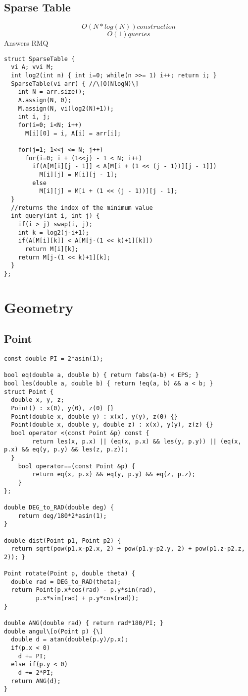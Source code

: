 \documentclass[11pt, oneside]{article}
\begin{document}
\subsection{Sparse Table}
\[O(N*log(N)) construction\]
\[O(1) queries\]
Answers RMQ
\begin{lstlisting}
struct SparseTable {
  vi A; vvi M;
  int log2(int n) { int i=0; while(n >>= 1) i++; return i; }
  SparseTable(vi arr) { //\[O(NlogN)\]
    int N = arr.size();
    A.assign(N, 0);
    M.assign(N, vi(log2(N)+1));
    int i, j;
    for(i=0; i<N; i++)
      M[i][0] = i, A[i] = arr[i];

    for(j=1; 1<<j <= N; j++)
      for(i=0; i + (1<<j) - 1 < N; i++)
        if(A[M[i][j - 1]] < A[M[i + (1 << (j - 1))][j - 1]])
          M[i][j] = M[i][j - 1];
        else
          M[i][j] = M[i + (1 << (j - 1))][j - 1];
  }
  //returns the index of the minimum value
  int query(int i, int j) {
    if(i > j) swap(i, j);
    int k = log2(j-i+1);
    if(A[M[i][k]] < A[M[j-(1 << k)+1][k]])
      return M[i][k];
    return M[j-(1 << k)+1][k];
  }
};
\end{lstlisting}

\section{Geometry}

\subsection{Point}
\begin{lstlisting}
const double PI = 2*asin(1);

bool eq(double a, double b) { return fabs(a-b) < EPS; }
bool les(double a, double b) { return !eq(a, b) && a < b; }
struct Point {
  double x, y, z;
  Point() : x(0), y(0), z(0) {}
  Point(double x, double y) : x(x), y(y), z(0) {}
  Point(double x, double y, double z) : x(x), y(y), z(z) {}
  bool operator <(const Point &p) const {
        return les(x, p.x) || (eq(x, p.x) && les(y, p.y)) || (eq(x, p.x) && eq(y, p.y) && les(z, p.z));
  }
    bool operator==(const Point &p) {
        return eq(x, p.x) && eq(y, p.y) && eq(z, p.z);
    }
};

double DEG_to_RAD(double deg) {
    return deg/180*2*asin(1);
}

double dist(Point p1, Point p2) {
  return sqrt(pow(p1.x-p2.x, 2) + pow(p1.y-p2.y, 2) + pow(p1.z-p2.z, 2)); }
  
Point rotate(Point p, double theta) {
  double rad = DEG_to_RAD(theta);
  return Point(p.x*cos(rad) - p.y*sin(rad),
         p.x*sin(rad) + p.y*cos(rad));
}

double ANG(double rad) { return rad*180/PI; }
double angul\[o(Point p) {\]
  double d = atan(double(p.y)/p.x);
  if(p.x < 0)
    d += PI;
  else if(p.y < 0)
    d += 2*PI;
  return ANG(d);
}
\end{lstlisting}
\end{document}
